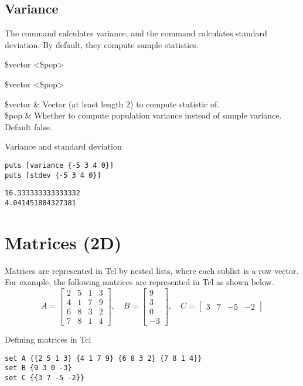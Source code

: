 \documentclass{article}
\begin{document}
\subsection{Variance}
The command  calculates variance, and the command  calculates standard deviation. By default, they compute sample statistics.
\begin{syntax}
 \$vector <\$pop>
\end{syntax}
\begin{syntax}
 \$vector <\$pop>
\end{syntax}
\begin{args}
\$vector & Vector (at least length 2) to compute statistic of.  \\
\$pop & Whether to compute population variance instead of sample variance. Default false.
\end{args}
\begin{example}{Variance and standard deviation}
\begin{lstlisting}
puts [variance {-5 3 4 0}]
puts [stdev {-5 3 4 0}]
\end{lstlisting}
\tcblower
\begin{lstlisting}
16.333333333333332
4.041451884327381
\end{lstlisting}
\end{example}

\clearpage
\section{Matrices (2D)}
Matrices are represented in Tcl by nested lists, where each sublist is a row vector.
For example, the following matrices are represented in Tcl as shown below.
\begin{equation*}\label{eq:matrix_AB}
A=\begin{bmatrix}
2 & 5 & 1 & 3 \\
4 & 1 & 7 & 9 \\
6 & 8 & 3 & 2 \\
7 & 8 & 1 & 4
\end{bmatrix},\quad
B=\begin{bmatrix}
9 \\ 3 \\ 0 \\ -3
\end{bmatrix},\quad
C = \begin{bmatrix}
3 & 7 & -5 & -2
\end{bmatrix}
\end{equation*}
\begin{example}[label=ex:matrix_AB]{Defining matrices in Tcl}
\begin{lstlisting}
set A {{2 5 1 3} {4 1 7 9} {6 8 3 2} {7 8 1 4}}
set B {9 3 0 -3}
set C {{3 7 -5 -2}}
\end{lstlisting}
\end{example}
\end{document}
